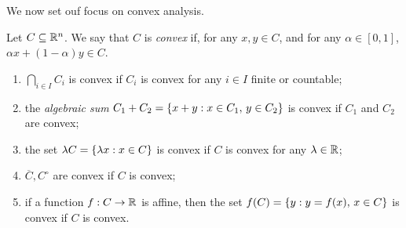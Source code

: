 We now set ouf focus on convex analysis.

\begin{definition}

    Let $C \subseteq {\mathbb{R}^n}$. We say that $C$ is \emph{convex} if, for any $x,y \in C$, and for any $\alpha \in [0,1]$, $\alpha x + (1-\alpha)y \in C$.
    
\end{definition}

\begin{proposition}[Book 1.1.1]
    
    \begin{enumerate}
        \item[a)] $\displaystyle\bigcap_{i \in I} C_i$ is convex if $C_i$ is convex for any $i \in I$ finite or countable;
        \item[b)] the \emph{algebraic sum} $C_1 + C_2 = \left\{ x + y : x \in C_1,\, y \in C_2 \right\}$ is convex if $C_1$ and $C_2$ are convex;
        \item[c)] the set $\lambda C = \left\{ \lambda x : x \in C \right\}$ is convex if $C$ is convex for any $\lambda \in \mathbb{R}$;
        \item[d)] $\overline{C},C^\circ$ are convex if $C$ is convex;
        \item[e)] if a function $f : C \to \mathbb{R}$ is affine, then the set $f(C) = \left\{ y : y = f(x), \, x \in C \right\}$ is convex if $C$ is convex.
    \end{enumerate}

\end{proposition}

